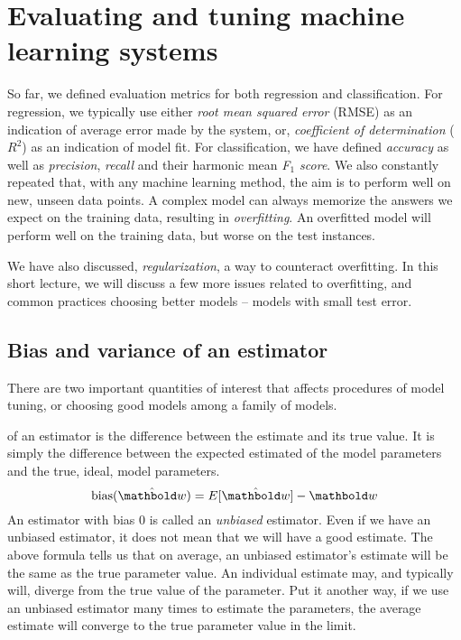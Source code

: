 \chapter{\label{chap:ml-eval}Evaluating and tuning machine learning systems}

So far, we defined evaluation metrics for both regression and classification.
For regression,
we typically use either \emph{root mean squared error} (RMSE)
as an indication of average error made by the system,
or, \emph{coefficient of determination} ($R^{2}$)
as an indication of model fit.
For classification,
we have defined \emph{accuracy} as well as \emph{precision},
\emph{recall} and their harmonic mean \emph{F$_{1}$ score}.
We also constantly repeated that,
with any machine learning method,
the aim is to perform well on new, unseen data points.
A complex model can always memorize the answers we expect on the training data,
resulting in \emph{overfitting}.
An overfitted model will perform well on the training data,
but worse on the test instances.

We have also discussed, \emph{regularization}, a way to counteract overfitting.
In this short lecture,
we will discuss a few more issues related to overfitting,
and common practices choosing better models --
models with small test error.

\section{Bias and variance of an estimator}

There are two important quantities of interest
that affects procedures of model tuning,
or choosing good models among a family of models.

 of an estimator is the difference between the estimate
and its true value.
It is simply the difference between the expected estimated
of the model parameters and the true, ideal, model parameters.
\begin{equation}
  \text{bias}(\hat{\vect{w}}) = E[\hat{\vect{w}}] - \vect{w} 
\end{equation}
An estimator with bias \num{0} is called an \emph{unbiased} estimator.
Even if we have an unbiased estimator,
it does not mean that we will have a good estimate.
The above formula tells us that on average,
an unbiased estimator's estimate will be the same as the true parameter value.
An individual estimate may, and typically will, diverge
from the true value of the parameter.
Put it another way,
if we use an unbiased estimator many times to estimate the parameters,
the average estimate will converge to the true parameter value in the limit.


